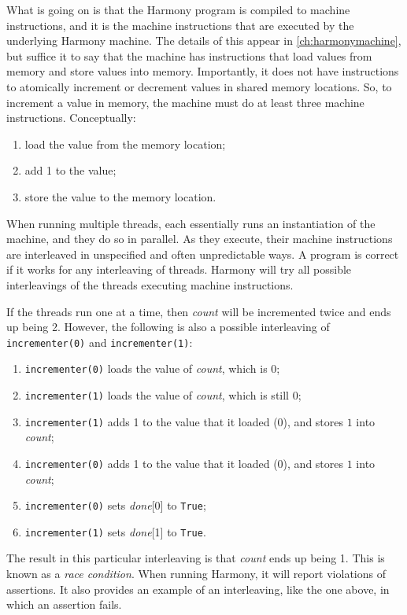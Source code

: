 \documentclass{report}
\begin{document}
What is going on is that the Harmony program is compiled to machine instructions,
%
and it is the machine instructions that are executed by the underlying Harmony
machine.  The details of this appear in \autoref{ch:harmonymachine},
but suffice it to
say that the machine has instructions that load values from memory and store
values into memory.  Importantly, it does not have instructions to atomically
increment or decrement values in shared memory locations.
So, to increment a value in memory,
the machine must do at least three machine instructions.  Conceptually:
\begin{enumerate}
\item load the value from the memory location;
\item add 1 to the value;
\item store the value to the memory location.
\end{enumerate}

When running multiple threads, each essentially runs an instantiation of
the machine, and they do so in parallel.  As they execute, their machine
instructions are interleaved
%
in unspecified and often unpredictable ways.
A program is correct if it works for any interleaving of threads.
Harmony will try all possible interleavings of the threads
executing machine instructions.

If the threads run one at a time, then \textit{count} will be incremented
twice and ends up being 2.  However, the following is also
a possible interleaving of \texttt{incrementer(0)} and \texttt{incrementer(1)}:
\begin{enumerate}
\item \texttt{incrementer(0)} loads the value of \textit{count}, which is 0;
\item \texttt{incrementer(1)} loads the value of \textit{count}, which is still 0;
\item \texttt{incrementer(1)} adds 1 to the value that it loaded (0), and
stores $1$ into \textit{count};
\item \texttt{incrementer(0)} adds 1 to the value that it loaded (0), and
stores $1$ into \textit{count};
\item \texttt{incrementer(0)} sets \textit{done}[0] to \texttt{True};
\item \texttt{incrementer(1)} sets \textit{done}[1] to \texttt{True}.
\end{enumerate}

The result in this particular interleaving is that \textit{count} ends up
being 1.
This is known as a \emph{race condition}.
%
When running Harmony, it will
report violations of assertions.  It also provides an example
of an interleaving, like the one above, in which an assertion fails.
\end{document}

